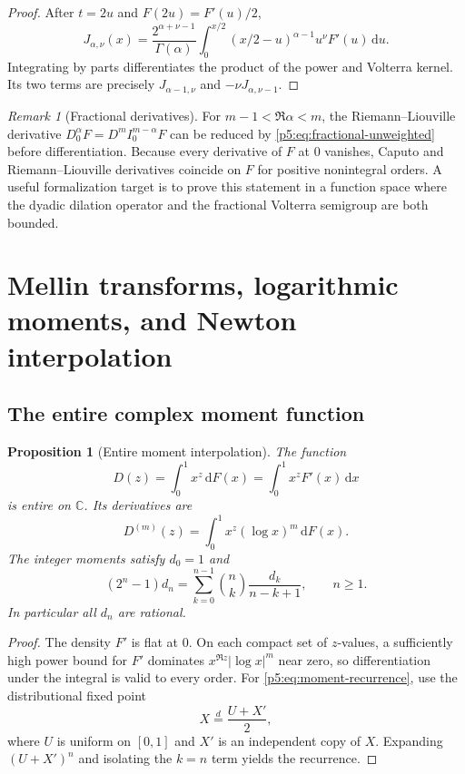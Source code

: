\documentclass[11pt,oneside]{article}
\newtheorem{proposition}[theorem]{Proposition}
\theoremstyle{definition}
\theoremstyle{remark}
\newtheorem{remark}[theorem]{Remark}
\newcommand{\C}{\mathbb C}
\newcommand{\dd}{\,\mathrm d}
\newcommand{\1}{\mathbf 1}
\begin{document}
\begin{proof}
After $t=2u$ and $F(2u)=F'(u)/2$,
\[
 J_{\alpha,\nu}(x)=\frac{2^{\alpha+\nu-1}}{\Gamma(\alpha)}
 \int_0^{x/2}(x/2-u)^{\alpha-1}u^\nu F'(u)\dd u.
\]
Integrating by parts differentiates the product of the power and Volterra kernel.  Its two terms are precisely $J_{\alpha-1,\nu}$ and $-\nu J_{\alpha,\nu-1}$.
\end{proof}

\begin{remark}[Fractional derivatives]
For $m-1<\Re\alpha<m$, the Riemann--Liouville derivative
$D_0^\alpha F=D^mI_0^{m-\alpha}F$ can be reduced by \eqref{p5:eq:fractional-unweighted} before differentiation.  Because every derivative of $F$ at $0$ vanishes, Caputo and Riemann--Liouville derivatives coincide on $F$ for positive nonintegral orders.  A useful formalization target is to prove this statement in a function space where the dyadic dilation operator and the fractional Volterra semigroup are both bounded.
\end{remark}

\section{Mellin transforms, logarithmic moments, and Newton interpolation}

\subsection{The entire complex moment function}

\begin{proposition}[Entire moment interpolation]\label{p5:prop:D-entire}
The function
\[
 D(z)=\int_0^1x^z\dd F(x)=\int_0^1x^zF'(x)\dd x
\]
is entire on $\C$.  Its derivatives are
\begin{equation}\label{p5:eq:D-derivatives}
 D^{(m)}(z)=\int_0^1x^z(\log x)^m\dd F(x).
\end{equation}
The integer moments satisfy $d_0=1$ and
\begin{equation}\label{p5:eq:moment-recurrence}
 (2^n-1)d_n=
 \sum_{k=0}^{n-1}\binom nk\frac{d_k}{n-k+1},
 \qquad n\ge1.
\end{equation}
In particular all $d_n$ are rational.
\end{proposition}

\begin{proof}
The density $F'$ is flat at $0$.  On each compact set of $z$-values, a sufficiently high power bound for $F'$ dominates $x^{\Re z}|\log x|^m$ near zero, so differentiation under the integral is valid to every order.  For \eqref{p5:eq:moment-recurrence}, use the distributional fixed point
\[
 X\overset d=\frac{U+X'}2,
\]
where $U$ is uniform on $[0,1]$ and $X'$ is an independent copy of $X$.  Expanding $(U+X')^n$ and isolating the $k=n$ term yields the recurrence.
\end{proof}
\end{document}
